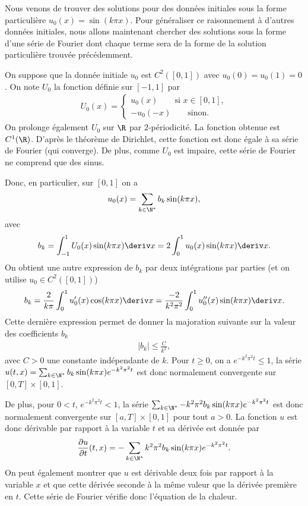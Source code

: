 \documentclass[12pt,a4paper,twoside]{article}
\begin{document}
Nous venons de trouver des solutions pour des donn\'ees initiales sous la forme particuli\`ere
$u_0(x) = \sin(k \pi x)$.
Pour g\'en\'eraliser ce raisonnement \`a d'autres donn\'ees initiales, nous allons maintenant
chercher des solutions sous la forme d'une s\'erie de Fourier dont chaque terme
sera de la forme de la solution particuli\`ere trouv\'ee pr\'ec\'edemment.

On suppose que la donn\'ee initiale $u_0$ est $C^2([0,1])$ avec $u_0(0) = u_0(1) = 0$.
On note $U_0$ la fonction d\'efinie sur $[-1,1]$ par
\begin{align*}
  U_0(x) =
  \begin{cases}
    u_0(x) \qquad \text{si } x \in [0,1] ,
    \\
    -u_0(-x) \qquad \text{sinon} .
  \end{cases}
\end{align*}
On prolonge \'egalement $U_0$ sur $\R$ par $2$-p\'eriodicit\'e.
La fonction obtenue est $C^1(\R)$.
D'apr\`es le th\'eor\`eme de Dirichlet, cette fonction est donc \'egale \`a 
sa s\'erie de Fourier (qui converge).
De plus, comme $U_0$ est impaire, cette s\'erie de Fourier ne comprend que 
des sinus.

Donc, en particulier, sur $[0,1]$ on a 
\begin{align*}
  u_0(x) = \sum_{k \in \N^*} b_k \sin(k \pi x) ,
\end{align*}
avec
\begin{align*}
  b_k
  = \int_{-1}^1 U_0(x) \sin(k \pi x) \deriv x 
  = 2 \int_{0}^1 u_0(x) \sin(k \pi x) \deriv x .
\end{align*}
On obtient une autre expression de $b_k$ par deux int\'egrations par parties
(et on utilise $u_0 \in C^2([0,1])$)
\begin{align*}
  b_k
  = \dfrac{2}{k \pi} \int_{0}^1 u_0'(x) \cos(k \pi x) \deriv x
  = \dfrac{-2}{k^2 \pi^2} \int_{0}^1 u_0''(x) \sin(k \pi x) \deriv x .
\end{align*}
Cette derni\`ere expression permet de donner la majoration suivante sur la valeur
des coefficients $b_k$
\begin{align*}
  | b_k | \leq \frac{C}{k^2} ,
\end{align*}
avec $C > 0$ une constante ind\'ependante de $k$.
Pour $t \geq 0$, on a $e^{-k^2 \pi^2 t} \leq 1$, la s\'erie 
$u(t,x) = \sum_{k\in\N^*} b_k \sin(k \pi x) e^{- k^2 \pi^2 t}$ est donc normalement
convergente sur $[0,T] \times [0,1]$.

De plus, pour $0 < t$, $e^{-k^2 \pi^2 t} < 1$, la s\'erie
$\sum_{k\in\N^*} - k^2 \pi^2 b_k \sin(k \pi x) e^{- k^2 \pi^2 t}$ est donc normalement
convergente sur $[a,T] \times [0,1]$ pour tout $a>0$.
La fonction $u$ est donc d\'erivable par rapport \`a la variable $t$
et sa d\'eriv\'ee est donn\'ee par
\begin{align*}
  \dfrac{\partial u}{\partial t} (t,x) 
  = - \sum_{k \in \N^*} k^2 \pi^2 b_k \sin(k \pi x) e^{-k^2 \pi^2 t} .
\end{align*}
On peut \'egalement montrer que $u$ est d\'erivable deux fois par rapport
\`a la variable $x$ et que cette d\'eriv\'ee seconde \`a la m\^eme
valeur que la d\'eriv\'ee premi\`ere en $t$.
Cette s\'erie de Fourier v\'erifie donc l'\'equation de la chaleur.
\end{document}
